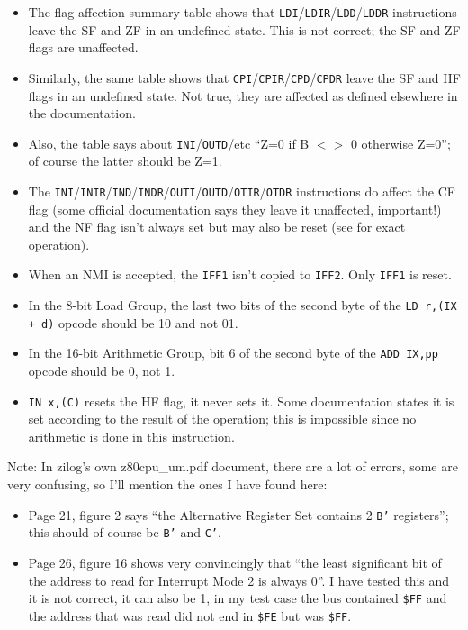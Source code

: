 \begin{itemize}

	\item
	The flag affection summary table shows that {\tt LDI}/{\tt LDIR}/{\tt LDD}/{\tt LDDR} instructions leave the SF and ZF in an undefined state. This is not correct; the SF and ZF flags are unaffected.

	\item
	Similarly, the same table shows that {\tt CPI}/{\tt CPIR}/{\tt CPD}/{\tt CPDR} leave the SF and HF flags in an undefined state. Not true, they are affected as defined elsewhere in the documentation.

	\item
	Also, the table says about {\tt INI}/{\tt OUTD}/etc ``Z=0 if B $<>$ 0 otherwise Z=0''; of course the latter should be Z=1.

	\item
	The {\tt INI}/{\tt INIR}/{\tt IND}/{\tt INDR}/{\tt OUTI}/{\tt OUTD}/{\tt OTIR}/{\tt OTDR} instructions do affect the CF flag (some official documentation says they leave it unaffected, important!) and the NF flag isn't always set but may also be reset (see  for exact operation).

	\item
	When an NMI is accepted, the {\tt IFF1} isn't copied to {\tt IFF2}. Only {\tt IFF1} is reset.

	\item
	In the 8-bit Load Group, the last two bits of the second byte of the {\tt LD r,(IX + d)} opcode should be 10 and not 01.

	\item
	In the 16-bit Arithmetic Group, bit 6 of the second byte of the {\tt ADD IX,pp} opcode should be 0, not 1.

	\item
	{\tt IN x,(C)} resets the HF flag, it never sets it. Some documentation states it is set according to the result of the operation; this is impossible since no arithmetic is done in this instruction.

\end{itemize}

Note: In zilog's own z80cpu\_um.pdf document, there are a lot of errors, some are very confusing, so I'll mention the ones I have found here:

\begin{itemize}

	\item
	Page 21, figure 2 says ``the Alternative Register Set contains 2 {\tt B'} registers''; this should of course be {\tt B'} and {\tt C'}.

	\item
	Page 26, figure 16 shows very convincingly that ``the least significant bit of the address to read for Interrupt Mode 2 is always 0''. I have tested this and it is not correct, it can also be 1, in my test case the bus contained {\tt \$FF} and the address that was read did not end in {\tt \$FE} but was {\tt \$FF}.
  
\end{itemize}
